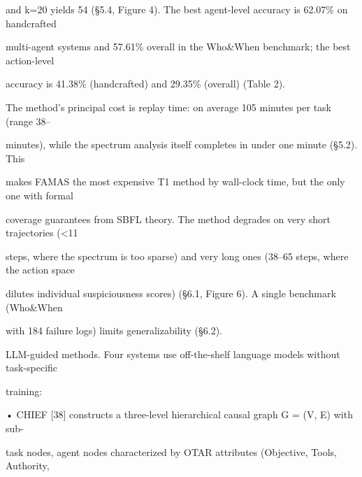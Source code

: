 \begin{flushleft}
\noindent and k=20 yields 54 (§5.4, Figure 4). The best agent-level accuracy is 62.07\% on handcrafted\par
\noindent multi-agent systems and 57.61\% overall in the Who\&When benchmark; the best action-level\par
\noindent accuracy is 41.38\% (handcrafted) and 29.35\% (overall) (Table 2).\par
\noindent  The method’s principal cost is replay time: on average 105 minutes per task (range 38–\par
{} minutes), while the spectrum analysis itself completes in under one minute (§5.2). This\par
\noindent makes FAMAS the most expensive T1 method by wall-clock time, but the only one with formal\par
\noindent coverage guarantees from SBFL theory. The method degrades on very short trajectories (<11\par
\noindent steps, where the spectrum is too sparse) and very long ones (38–65 steps, where the action space\par
\noindent dilutes individual suspiciousness scores) (§6.1, Figure 6). A single benchmark (Who\&When\par
\noindent with 184 failure logs) limits generalizability (§6.2).\par
\par\smallskip
\noindent LLM-guided methods. Four systems use off-the-shelf language models without task-specific\par
\noindent training:\par
\noindent  • CHIEF [38] constructs a three-level hierarchical causal graph G = (V, E) with sub-\par
\noindent  task nodes, agent nodes characterized by OTAR attributes (Objective, Tools, Authority,\par
\end{flushleft}
